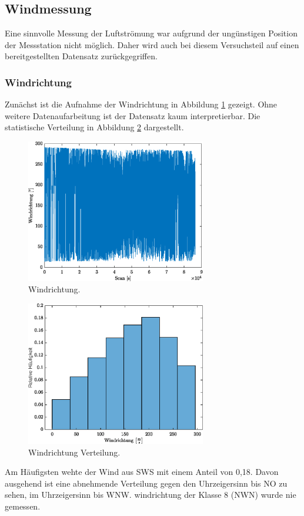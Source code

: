 \subsection{Windmessung}
Eine sinnvolle Messung der Luftströmung war aufgrund der ungünstigen Position der Messstation nicht möglich. Daher wird auch bei diesem Versuchsteil auf einen bereitgestellten Datensatz zurückgegriffen.

\subsubsection{Windrichtung}

Zunächst ist die Aufnahme der Windrichtung in Abbildung \ref{fig:winddir} gezeigt. Ohne weitere Datenaufarbeitung ist der Datensatz kaum interpretierbar. Die statistische Verteilung in Abbildung \ref{fig:winddirCN} dargestellt.
\begin{figure}[H]
	\centering
	\includegraphics[width=0.7\textwidth]{../DATA/Windrichtung.eps}
	\caption[Windrichtung]{Windrichtung.}
	\label{fig:winddir}
\end{figure}

\begin{figure}[H]
	\centering
	\includegraphics[width=0.7\textwidth]{../DATA/WinddirCN.eps}
	\caption[Windrichtung Verteilung]{Windrichtung Verteilung.}
	\label{fig:winddirCN}
\end{figure}
Am Häufigsten wehte der Wind aus SWS mit einem Anteil von 0,18. Davon ausgehend ist eine abnehmende Verteilung gegen den Uhrzeigersinn bis NO zu sehen, im Uhrzeigersinn bis WNW. windrichtung der Klasse 8 (NWN) wurde nie gemessen.
